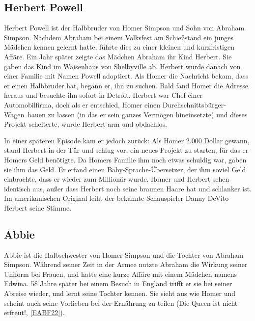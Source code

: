 \subsection{Herbert Powell}
Herbert Powell ist der Halbbruder von Homer Simpson und Sohn von Abraham Simpson. Nachdem Abraham bei einem Volksfest am Schießstand ein junges Mädchen kennen gelernt hatte, führte dies zu einer kleinen und kurzfristigen Affäre. Ein Jahr später zeigte das Mädchen Abraham ihr Kind Herbert. Sie gaben das Kind im Waisenhaus von Shelbyville ab. Herbert wurde danach von einer Familie mit Namen Powell adoptiert. Als Homer die Nachricht bekam, dass er einen Halbbruder hat, begann er, ihn zu suchen. Bald fand Homer die Adresse heraus und besuchte ihn sofort in Detroit. Herbert war Chef einer Automobilfirma, doch als er entschied, Homer einen \glqq Durchschnittsbürger-Wagen\grqq\ bauen zu lassen (in das er sein ganzes Vermögen hineinsetzte) und dieses Projekt scheiterte, wurde Herbert arm und obdachlos.

In einer späteren Episode kam er jedoch zurück: Als Homer 2.000 Dollar gewann, stand Herbert in der Tür und schlug vor, ein neues Projekt zu starten, für das er Homers Geld benötigte. Da Homers Familie ihm noch etwas schuldig war, gaben sie ihm das Geld. Er erfand einen \glqq Baby-Sprache-Übersetzer\grqq , der ihm soviel Geld einbrachte, dass er wieder zum Millionär wurde. Homer und Herbert sehen identisch aus, außer dass Herbert noch seine braunen Haare hat und schlanker ist. Im amerikanischen Original leiht der bekannte Schauspieler Danny DeVito Herbert seine Stimme.



\subsection{Abbie}
Abbie ist die Halbschwester von Homer Simpson und die Tochter von Abraham Simpson. Während seiner Zeit in der Armee nutzte Abraham die Wirkung seiner Uniform bei Frauen, und hatte eine kurze Affäre mit einem Mädchen namens Edwina. 58 Jahre später bei einem Besuch in England trifft er sie bei seiner Abreise wieder, und lernt seine Tochter kennen. Sie sieht aus wie Homer und scheint auch seine Vorlieben bei der Ernährung zu teilen (\glqq Die Queen ist nicht erfreut!\grqq , \ref{EABF22}).



